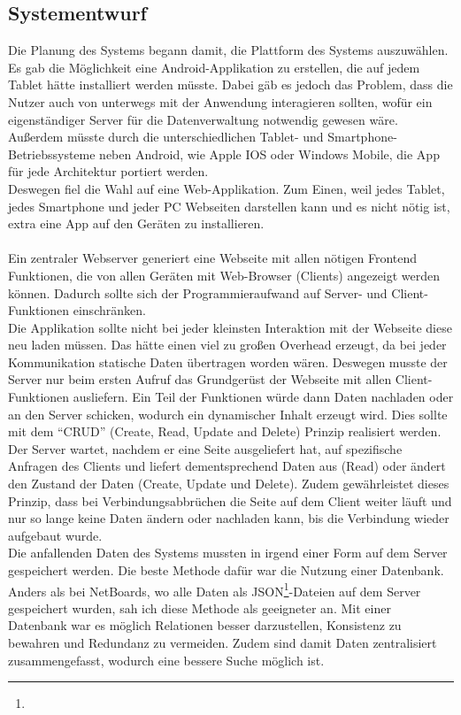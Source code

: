 \subsection{Systementwurf}\label{Systementwurf}
Die Planung des Systems begann damit, die Plattform des Systems auszuwählen. Es gab die Möglichkeit eine Android-Applikation zu erstellen, die auf jedem Tablet hätte installiert werden müsste. Dabei gäb es jedoch das Problem, dass die Nutzer auch von unterwegs mit der Anwendung interagieren sollten, wofür ein eigenständiger Server für die Datenverwaltung notwendig gewesen wäre. Außerdem müsste durch die unterschiedlichen Tablet- und Smartphone-Betriebssysteme neben Android, wie Apple IOS oder Windows Mobile, die App für jede Architektur portiert werden.
\\
Deswegen fiel die Wahl auf eine Web-Applikation. Zum Einen, weil jedes Tablet, jedes Smartphone und jeder PC Webseiten darstellen kann und es nicht nötig ist, extra eine App auf den Geräten zu installieren.
\\ \\
Ein zentraler Webserver generiert eine Webseite mit allen nötigen Frontend Funktionen, die von allen Geräten mit Web-Browser (Clients) angezeigt werden können. Dadurch sollte sich der Programmieraufwand auf Server- und Client-Funktionen einschränken.
\\
Die Applikation sollte nicht bei jeder kleinsten Interaktion mit der Webseite diese neu laden müssen. Das hätte einen viel zu großen Overhead erzeugt, da bei jeder Kommunikation statische Daten übertragen worden wären.
Deswegen musste der Server nur beim ersten Aufruf das Grundgerüst der Webseite mit allen Client-Funktionen ausliefern. Ein Teil der Funktionen würde dann Daten nachladen oder an den Server schicken, wodurch ein dynamischer Inhalt erzeugt wird.
Dies sollte mit dem ``CRUD'' (Create, Read, Update and Delete) Prinzip realisiert werden.
Der Server wartet, nachdem er eine Seite ausgeliefert hat, auf spezifische Anfragen des Clients und liefert dementsprechend Daten aus (Read) oder ändert den Zustand der Daten (Create, Update und Delete). Zudem gewährleistet dieses Prinzip, dass bei Verbindungsabbrüchen die Seite auf dem Client weiter läuft und nur so lange keine Daten ändern oder nachladen kann, bis die Verbindung wieder aufgebaut wurde.
\\
Die anfallenden Daten des Systems mussten in irgend einer Form auf dem Server gespeichert werden. Die beste Methode dafür war die Nutzung einer Datenbank. Anders als bei NetBoards, wo alle Daten als JSON\footnote{}-Dateien auf dem Server gespeichert wurden, sah ich diese Methode als geeigneter an. Mit einer Datenbank war es möglich Relationen besser darzustellen, Konsistenz zu bewahren und Redundanz zu vermeiden. Zudem sind damit Daten zentralisiert zusammengefasst, wodurch eine bessere Suche möglich ist.

